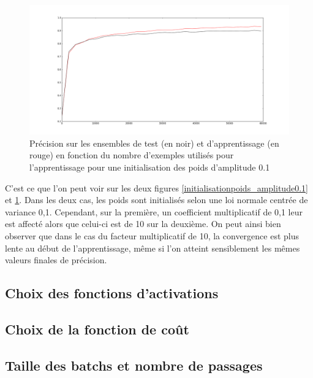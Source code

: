 \documentclass{report}
\theoremstyle{plain}
\theoremstyle{definition}
\theoremstyle{remark}
\begin{document}
\begin{figure}[!h]
\begin{center}
\includegraphics[scale=0.2]{images/initialisationpoids_amplitude10.png}
\caption{Précision sur les ensembles de test (en noir) et d'apprentissage (en rouge) en fonction du nombre d'exemples utilisés pour l'apprentissage pour une initialisation des poids d'amplitude 0.1}
\label{initialisationpoids_amplitude10}
\end{center}
\end{figure}

C'est ce que l'on peut voir sur les deux figures \ref{initialisationpoids_amplitude0.1} et \ref{initialisationpoids_amplitude10}. Dans les deux cas, les poids sont initialisés selon une loi normale centrée de variance 0,1. Cependant, sur la première, un coefficient multiplicatif de 0,1 leur est affecté alors que celui-ci est de 10 sur la deuxième.
On peut ainsi bien observer que dans le cas du facteur multiplicatif de 10, la convergence est plus lente au début de l'apprentissage, même si l'on atteint sensiblement les mêmes valeurs finales de précision.



\subsection{Choix des fonctions d'activations}


\subsection{Choix de la fonction de coût}


\subsection{Taille des batchs et nombre de passages}
\end{document}
